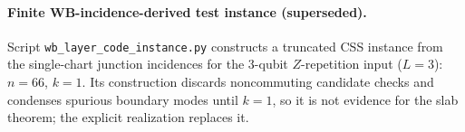 \documentclass[aps,prx,reprint,superscriptaddress,nofootinbib,floatfix,longbibliography]{revtex4-2}
\theoremstyle{definition}
\begin{document}
\paragraph{Finite WB-incidence-derived test instance (superseded).}
Script \texttt{wb\_layer\_code\_instance.py} constructs a truncated CSS instance from the single-chart junction incidences for the 3-qubit $Z$-repetition input ($L=3$): $n=66$, $k=1$.  Its construction discards noncommuting candidate checks and condenses spurious boundary modes until $k=1$, so it is not evidence for the slab theorem; the explicit realization replaces it.


\end{document}
